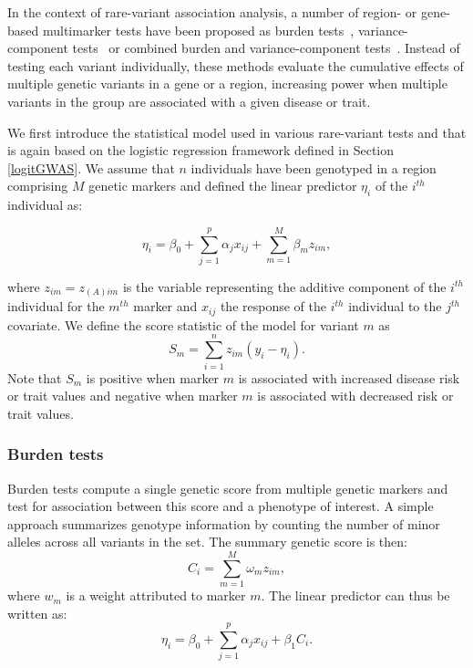 \documentclass[]{book}
\begin{document}
In the context of rare-variant association analysis, a number of region-
or gene-based multimarker tests have been proposed as burden
tests~\citep{asimit_ariel_2012}, variance-component
tests~\citep{wu_rare-variant_2011} or combined burden and variance-component
tests~\citep{lee_optimal_2012}. Instead of testing each variant individually,
these methods evaluate the cumulative effects of multiple genetic
variants in a gene or a region, increasing power when multiple variants
in the group are associated with a given disease or trait.

We first introduce the statistical model used in various rare-variant
tests and that is again based on the logistic regression framework
defined in Section \ref{logitGWAS}. We assume that \(n\) individuals
have been genotyped in a region comprising \(M\) genetic markers and
defined the linear predictor \(\eta_i\) of the \(i^{th}\) individual as:

\[\eta_i = \beta_0 + \sum_{j=1}^p \alpha_j x_{ij} + \sum_{m=1}^M \beta_m z_{im},
\label{eq:linearpred}\]

where \(z_{im} = z_{(A)im}\) is the variable representing the additive
component of the \(i^{th}\) individual for the \(m^{th}\) marker and
\(x_{ij}\) the response of the \(i^{th}\) individual to the \(j^{th}\)
covariate. We define the score statistic of the model for variant \(m\) as
\[S_m = \sum_{i=1}^n z_{im} (y_i - \eta_i).\] Note that \(S_m\) is
positive when marker \(m\) is associated with increased disease risk or
trait values and negative when marker \(m\) is associated with decreased
risk or trait values.

\hypertarget{burden-tests}{%
\subsubsection*{Burden tests}\label{burden-tests}}

Burden tests \citep{asimit_ariel_2012, li2008methods} compute a single
genetic score from multiple genetic markers and test for association
between this score and a phenotype of interest. A simple approach
summarizes genotype information by counting the number of minor alleles
across all variants in the set. The summary genetic score is then:
\[C_i = \sum_{m=1}^M \omega_m z_{im},
\label{eq:burden_fun}\] where \(w_m\) is a weight attributed to marker
\(m\). The linear predictor can thus be written as:
\[\eta_i =  \beta_0 + \sum_{j=1}^p \alpha_j x_{ij} + \beta_1 C_i.\]
\end{document}
